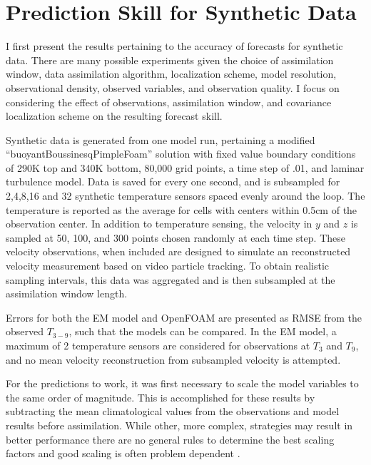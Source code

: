 \section{Prediction Skill for Synthetic Data}

I first present the results pertaining to the accuracy of forecasts for synthetic data.
There are many possible experiments given the choice of assimilation window, data assimilation algorithm, localization scheme, model resolution, observational density, observed variables, and observation quality.
I focus on considering the effect of observations, assimilation window, and covariance localization scheme on the resulting forecast skill.

Synthetic data is generated from one model run, pertaining a modified ``buoyantBoussinesqPimpleFoam'' solution with fixed value boundary conditions of 290K top and 340K bottom, 80,000 grid points, a time step of .01, and laminar turbulence model.
Data is saved for every one second, and is subsampled for 2,4,8,16 and 32 synthetic temperature sensors spaced evenly around the loop.
The temperature is reported as the average for cells with centers within 0.5cm of the observation center.
In addition to temperature sensing, the velocity in $y$ and $z$ is sampled at 50, 100, and 300 points chosen randomly at each time step.
These velocity observations, when included are designed to simulate an reconstructed velocity measurement based on video particle tracking.
To obtain realistic sampling intervals, this data was aggregated and is then subsampled at the assimilation window length.

Errors for both the EM model and OpenFOAM are presented as RMSE from the observed $T_{3-9}$, such that the models can be compared.
In the EM model, a maximum of 2 temperature sensors are considered for observations at $T_3$ and $T_9$, and no mean velocity reconstruction from subsampled velocity is attempted.

For the predictions to work, it was first necessary to scale the model variables to the same order of magnitude.
This is accomplished for these results by subtracting the mean climatological values from the observations and model results before assimilation. 
While other, more complex, strategies may result in better performance there are no general rules to determine the best scaling factors and good scaling is often problem dependent .


